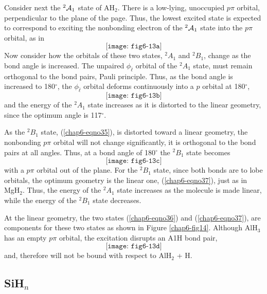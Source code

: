 Consider next the ${^2{\cal A}}_1$  state of AH$_2$.  There is a low-lying,
unoccupied $p\pi$ orbital, perpendicular to the plane of the page.  
Thus, the
lowest excited state is expected to correspond to exciting the nonbonding
electron of the ${^2{\cal A}}_1$ state into the $p\pi$ orbital, as in
\begin{equation}
\texttt{[image: fig6-13a]}
\label{chap6-eqno35}
\end{equation}
Now consider how the orbitals of these two states, ${^2A}_1$ and 
${^2B}_1$, change as the bond angle is increased. The unpaired 
$\phi_{\bar{\ell}}$ orbital of the ${^2A}_1$ state, must remain 
orthogonal to the bond pairs, Pauli principle. Thus, as the bond angle is 
increased to 180$^{\circ}$, the $\phi_{\bar{\ell}}$ orbital deforms 
continuously into a $p$ orbital at 180$^{\circ}$,
\begin{equation}
\texttt{[image: fig6-13b]}
\label{chap6-eqno36}
\end{equation}
and the energy of the ${^2A}_1$ state increases as it is distorted 
to the linear geometry, since the optimum angle is 117$^{\circ}$.

As the ${^2B}_1$ state, (\ref{chap6-eqno35}), is distorted toward a
linear geometry, the nonbonding $p\pi$ orbital will not change
significantly, it is orthogonal to the bond pairs at all angles.
Thus, at a bond angle of 180$^{\circ}$ the ${^2B}_1$ state becomes
\begin{equation}
\texttt{[image: fig6-13c]}
\label{chap6-eqno37}
\end{equation}
with a $p\pi$ orbital out of the plane. For the ${^2B}_1$ state, since
both bonds are to lobe orbitals, the optimum geometry is the linear
one, (\ref{chap6-eqno37}), just as in MgH$_2$.  Thus, the energy of
the ${^2A}_1$ state increases as the molecule is made linear, while
the energy of the ${^2B}_1$ state decreases.

At the linear geometry, the two states (\ref{chap6-eqno36}) and
(\ref{chap6-eqno37}), are components for these two states as shown in
Figure \ref{chap6-fig14}.  Although AlH$_3$ has an empty $p\pi$
orbital, the excitation disrupts an A1H bond pair,
\begin{equation}
\texttt{[image: fig6-13d]}
\end{equation}
and, therefore will not be bound with respect to AlH$_2$ + H.

\subsection{SiH$_n$}

